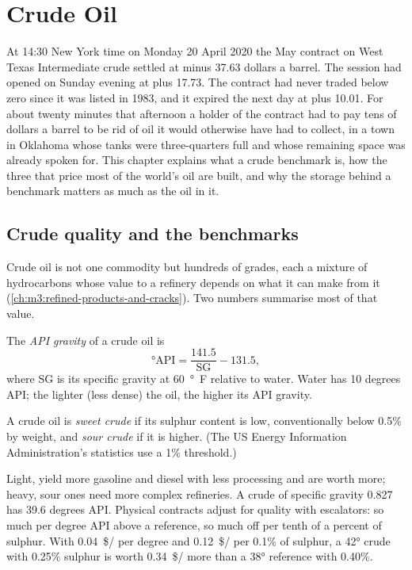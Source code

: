 \chapter{Crude Oil}\label{ch:m3:crude-oil}

At 14:30 New York time on Monday 20 April 2020 the May contract on West Texas
Intermediate crude settled at minus 37.63 dollars a barrel. The session had
opened on Sunday evening at plus 17.73. The contract had never traded below zero
since it was listed in 1983, and it expired the next day at plus 10.01. For about
twenty minutes that afternoon a holder of the contract had to pay tens of dollars
a barrel to be rid of oil it would otherwise have had to collect, in a town in
Oklahoma whose tanks were three-quarters full and whose remaining space was already
spoken for. This chapter explains what a crude benchmark is, how the three that
price most of the world's oil are built, and why the storage behind a benchmark
matters as much as the oil in it.

\section{Crude quality and the benchmarks}

Crude oil is not one commodity but hundreds of grades, each a mixture of
hydrocarbons whose value to a refinery depends on what it can make from it
(\cref{ch:m3:refined-products-and-cracks}). Two numbers summarise most of that
value.

\begin{definition}\label{def:m3:crude-oil:api}
The \emph{API gravity} of a crude oil is
\[
\text{°API} = \frac{141.5}{\mathrm{SG}} - 131.5 ,
\]
where $\mathrm{SG}$ is its specific gravity at \qty{60}{\degree F} relative to water.
Water has 10 degrees API; the lighter (less dense) the oil, the higher its API
gravity.
\end{definition}

\begin{definition}\label{def:m3:crude-oil:sweet}
A crude oil is \emph{sweet crude} if its sulphur content is
low, conventionally below 0.5\% by weight, and \emph{sour crude}
if it is higher. (The US Energy Information Administration's statistics use a 1\%
threshold.)
\end{definition}

Light,  yield more gasoline and diesel with less processing and are
worth more; heavy, sour ones need more complex refineries. A crude of specific
gravity 0.827 has 39.6 degrees API. Physical contracts adjust for quality with
escalators: so much per degree API above a reference, so much off per tenth of a
percent of sulphur. With \qty{0.04}{\$/\barrel} per degree and
\qty{0.12}{\$/\barrel} per 0.1\% of sulphur, a 42° crude with 0.25\% sulphur is worth
\qty{0.34}{\$/\barrel} more than a 38° reference with 0.40\%.

